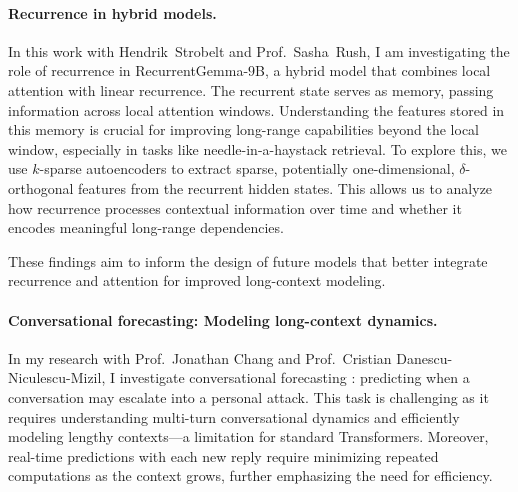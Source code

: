 
\paragraph{Recurrence in hybrid models.}

In this work with Hendrik~Strobelt and Prof.~Sasha~Rush, I am investigating the role of recurrence in RecurrentGemma-$9$B, a hybrid model that combines local attention with linear recurrence.
%
The recurrent state serves as memory, passing information across local attention windows.
%
Understanding the features stored in this memory is crucial for improving long-range capabilities beyond the local window, especially in tasks like needle-in-a-haystack retrieval.
%
To explore this, we use $k$-sparse autoencoders to extract sparse, potentially one-dimensional, $\delta$-orthogonal features from the recurrent hidden states.
%
This allows us to analyze how recurrence processes contextual information over time and whether it encodes meaningful long-range dependencies.

These findings aim to inform the design of future models that better integrate recurrence and attention for improved long-context modeling.



\paragraph{Conversational forecasting: Modeling long-context dynamics.}

In my research with Prof.~Jonathan Chang and Prof.~Cristian Danescu-Niculescu-Mizil, I investigate conversational forecasting \citep{chang_trouble_2019}: predicting when a conversation may escalate into a personal attack.
%
This task is challenging as it requires understanding multi-turn conversational dynamics and efficiently modeling lengthy contexts---a limitation for standard Transformers.
%
Moreover, real-time predictions with each new reply require minimizing repeated computations as the context grows, further emphasizing the need for efficiency.

